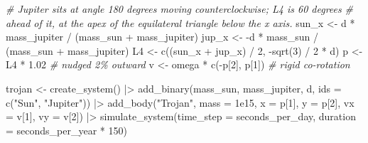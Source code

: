 \documentclass[
  10.5pt,
  letterpaper,
]{scrbook}
\newenvironment{Shaded}{\begin{snugshade}}{\end{snugshade}}
\newcommand{\AttributeTok}[1]{\textcolor[rgb]{0.00,0.00,0.00}{#1}}
\newcommand{\CommentTok}[1]{\textcolor[rgb]{0.00,0.00,0.00}{\textit{#1}}}
\newcommand{\DecValTok}[1]{\textcolor[rgb]{0.00,0.00,0.00}{#1}}
\newcommand{\FloatTok}[1]{\textcolor[rgb]{0.00,0.00,0.00}{#1}}
\newcommand{\FunctionTok}[1]{\textcolor[rgb]{0.00,0.00,0.00}{#1}}
\newcommand{\NormalTok}[1]{\textcolor[rgb]{0.00,0.00,0.00}{#1}}
\newcommand{\OtherTok}[1]{\textcolor[rgb]{0.00,0.00,0.00}{#1}}
\newcommand{\SpecialCharTok}[1]{\textcolor[rgb]{0.00,0.00,0.00}{#1}}
\newcommand{\StringTok}[1]{\textcolor[rgb]{0.00,0.00,0.00}{#1}}
\theoremstyle{plain}
\theoremstyle{remark}
\begin{document}
\begin{Shaded}
\begin{Highlighting}[]
\CommentTok{\# Jupiter sits at angle 180 degrees moving counterclockwise; L4 is 60 degrees}
\CommentTok{\# ahead of it, at the apex of the equilateral triangle below the x axis.}
\NormalTok{sun\_x }\OtherTok{\textless{}{-}}\NormalTok{ d }\SpecialCharTok{*}\NormalTok{ mass\_jupiter }\SpecialCharTok{/}\NormalTok{ (mass\_sun }\SpecialCharTok{+}\NormalTok{ mass\_jupiter)}
\NormalTok{jup\_x }\OtherTok{\textless{}{-}} \SpecialCharTok{{-}}\NormalTok{d }\SpecialCharTok{*}\NormalTok{ mass\_sun }\SpecialCharTok{/}\NormalTok{ (mass\_sun }\SpecialCharTok{+}\NormalTok{ mass\_jupiter)}
\NormalTok{L4    }\OtherTok{\textless{}{-}} \FunctionTok{c}\NormalTok{((sun\_x }\SpecialCharTok{+}\NormalTok{ jup\_x) }\SpecialCharTok{/} \DecValTok{2}\NormalTok{, }\SpecialCharTok{{-}}\FunctionTok{sqrt}\NormalTok{(}\DecValTok{3}\NormalTok{) }\SpecialCharTok{/} \DecValTok{2} \SpecialCharTok{*}\NormalTok{ d)}
\NormalTok{p     }\OtherTok{\textless{}{-}}\NormalTok{ L4 }\SpecialCharTok{*} \FloatTok{1.02}                            \CommentTok{\# nudged 2\% outward}
\NormalTok{v     }\OtherTok{\textless{}{-}}\NormalTok{ omega }\SpecialCharTok{*} \FunctionTok{c}\NormalTok{(}\SpecialCharTok{{-}}\NormalTok{p[}\DecValTok{2}\NormalTok{], p[}\DecValTok{1}\NormalTok{])               }\CommentTok{\# rigid co{-}rotation}

\NormalTok{trojan }\OtherTok{\textless{}{-}} \FunctionTok{create\_system}\NormalTok{() }\SpecialCharTok{|\textgreater{}}
  \FunctionTok{add\_binary}\NormalTok{(mass\_sun, mass\_jupiter, d, }\AttributeTok{ids =} \FunctionTok{c}\NormalTok{(}\StringTok{"Sun"}\NormalTok{, }\StringTok{"Jupiter"}\NormalTok{)) }\SpecialCharTok{|\textgreater{}}
  \FunctionTok{add\_body}\NormalTok{(}\StringTok{"Trojan"}\NormalTok{, }\AttributeTok{mass =} \FloatTok{1e15}\NormalTok{, }\AttributeTok{x =}\NormalTok{ p[}\DecValTok{1}\NormalTok{], }\AttributeTok{y =}\NormalTok{ p[}\DecValTok{2}\NormalTok{], }\AttributeTok{vx =}\NormalTok{ v[}\DecValTok{1}\NormalTok{], }\AttributeTok{vy =}\NormalTok{ v[}\DecValTok{2}\NormalTok{]) }\SpecialCharTok{|\textgreater{}}
  \FunctionTok{simulate\_system}\NormalTok{(}\AttributeTok{time\_step =}\NormalTok{ seconds\_per\_day, }\AttributeTok{duration =}\NormalTok{ seconds\_per\_year }\SpecialCharTok{*} \DecValTok{150}\NormalTok{)}
\end{Highlighting}
\end{Shaded}
\end{document}

